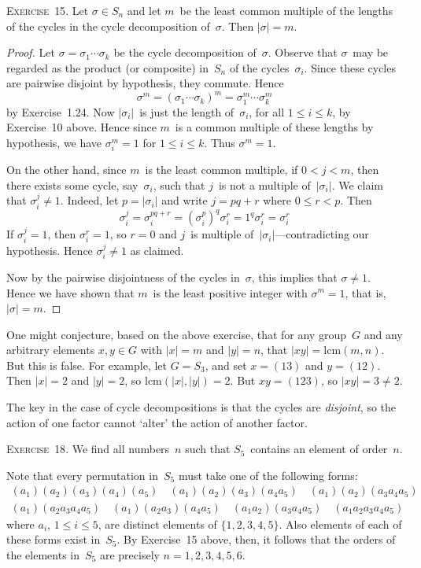 \documentclass[letterpaper]{article}
\newcommand{\exercise}[1]{\goodbreak\noindent\textsc{Exercise~{#1}.}}
\newcommand{\lcm}[2]{\mathrm{lcm}({#1},{#2})}
\newcommand{\ord}[1]{|{#1}|}
\begin{document}
\exercise{15}
Let $\sigma\in S_n$ and let $m$~be the least common multiple of the lengths of the cycles in the cycle decomposition of~$\sigma$. Then $\ord{\sigma}=m$.
\begin{proof}
Let $\sigma=\sigma_1\cdots\sigma_k$ be the cycle decomposition of~$\sigma$. Observe that $\sigma$~may be regarded as the product (or composite) in~$S_n$ of the cycles~$\sigma_i$. Since these cycles are pairwise disjoint by hypothesis, they commute. Hence
$$\sigma^m=(\sigma_1\cdots\sigma_k)^m=\sigma_1^m\cdots\sigma_k^m$$
by Exercise~1.24. Now $\ord{\sigma_i}$~is just the length of~$\sigma_i$, for all $1\le i\le k$, by Exercise~10 above. Hence since $m$~is a common multiple of these lengths by hypothesis, we have $\sigma_i^m=1$ for $1\le i\le k$. Thus $\sigma^m=1$.

On the other hand, since $m$~is the least common multiple, if $0<j<m$, then there exists some cycle, say~$\sigma_i$, such that $j$~is not a multiple of~$\ord{\sigma_i}$. We claim that $\sigma_i^j\ne 1$. Indeed, let $p=\ord{\sigma_i}$ and write $j=pq+r$ where $0\le r<p$. Then
$$\sigma_i^j=\sigma_i^{pq+r}=(\sigma_i^p)^q\sigma_i^r=1^q\sigma_i^r=\sigma_i^r$$
If $\sigma_i^j=1$, then $\sigma_i^r=1$, so $r=0$ and $j$~is multiple of~$\ord{\sigma_i}$---contradicting our hypothesis. Hence $\sigma_i^j\ne 1$ as claimed.

Now by the pairwise disjointness of the cycles in~$\sigma$, this implies that $\sigma\ne 1$. Hence we have shown that $m$~is the least positive integer with $\sigma^m=1$, that is, $\ord{\sigma}=m$.
\end{proof}
\noindent One might conjecture, based on the above exercise, that for any group~$G$ and any arbitrary elements $x,y\in G$ with $\ord{x}=m$ and $\ord{y}=n$, that $\ord{xy}=\lcm{m}{n}$. But this is false. For example, let $G=S_3$, and set $x=(13)$ and $y=(12)$. Then $\ord{x}=2$ and $\ord{y}=2$, so $\lcm{\ord{x}}{\ord{y}}=2$. But $xy=(123)$, so $\ord{xy}=3\ne2$.

The key in the case of cycle decompositions is that the cycles are \emph{disjoint}, so the action of one factor cannot `alter' the action of another factor.

\bigskip
\exercise{18}
We find all numbers~$n$ such that $S_5$~contains an element of order~$n$.

Note that every permutation in~$S_5$ must take one of the following forms:
\begin{multline*}
(a_1)(a_2)(a_3)(a_4)(a_5)\quad(a_1)(a_2)(a_3)(a_4a_5)\quad(a_1)(a_2)(a_3a_4a_5)\\
	(a_1)(a_2a_3a_4a_5)\quad(a_1)(a_2a_3)(a_4a_5)\quad(a_1a_2)(a_3a_4a_5)\quad(a_1a_2a_3a_4a_5)
\end{multline*}
where $a_i$, $1\le i\le 5$, are distinct elements of $\{1,2,3,4,5\}$. Also elements of each of these forms exist in~$S_5$. By Exercise~15 above, then, it follows that the orders of the elements in~$S_5$ are precisely $n=1,2,3,4,5,6$.
\end{document}
